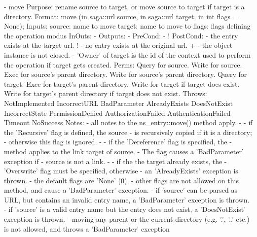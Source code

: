 \begin{myspec}
 
    - move
      Purpose:  rename source to target, or move source to
                target if target is a directory.
      Format:   move               (in  saga::url  source,
                                    in  saga::url  target,
                                    in  int     flags = None);
      Inputs:   source:             name to move
                target:             name to move to
                flags:              flags defining the operation
                                    modus
      InOuts:   -
      Outputs:  -
      PreCond:  -
!     PostCond: - the entry exists at the target url.
!               - no entry exists at the original url.
+               - the object instance is not closed.
                - 'Owner' of target is the id of the context
                  used to perform the operation if target gets
                  created.
      Perms:    Query for source.
                Write for source.
                Exec  for source's parent directory.
                Write for source's parent directory.
                Query for target.
                Exec  for target's parent directory.
                Write for target
                      if  target does exist.
                Write for target's parent directory 
                      if  target does not exist.
      Throws:   NotImplemented
                IncorrectURL
                BadParameter
                AlreadyExists
                DoesNotExist
                IncorrectState
                PermissionDenied
                AuthorizationFailed
                AuthenticationFailed
                Timeout
                NoSuccess
      Notes:    - all notes to the ns_entry::move() method
                  apply.
 -              - if the 'Recursive' flag is defined, the source
 -                is recursively copied if it is a directory;
 -                otherwise this flag is ignored.
 -              - if the 'Dereference' flag is specified, the
 -                method applies to the link target of source.
 -                The flag causes a 'BadParameter' exception if
 -                source is not a link.
 -              - if the the target already exists, the 
 -                'Overwrite' flag must be specified, otherwise
 -                an 'AlreadyExists' exception is thrown.
                - the default flags are 'None' (0).
                - other flags are not allowed on this method, 
                  and cause a 'BadParameter' exception.
                - if 'source' can be parsed as URL, but contains 
                  an invalid entry name, a 'BadParameter'
                  exception is thrown.
                - if 'source' is a valid entry name but the entry
                  does not exist, a 'DoesNotExist' exception is
                  thrown.
                - moving any parent or the current directory 
                  (e.g.  '.', '..' etc.) is not allowed, and 
                  throws a 'BadParameter' exception
 

\end{myspec}

